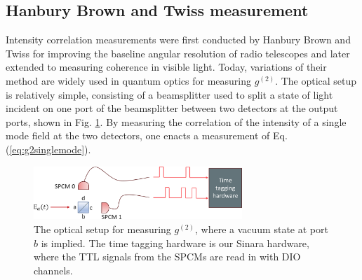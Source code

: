 \subsection{Hanbury Brown and Twiss measurement}

Intensity correlation measurements were first conducted by Hanbury Brown and Twiss for improving the baseline angular resolution of radio telescopes\cite{HANBURYBROWN1956} and later extended to measuring coherence in visible light\cite{brown1958interferometry}. Today, variations of their method are widely used in quantum optics for measuring $g^{(2)}$. The optical setup is relatively simple, consisting of a beamsplitter used to split a state of light incident on one port of the beamsplitter between two detectors at the output ports, shown in Fig. \ref{fig:hbtsetup}. By measuring the correlation of the intensity of a single mode field at the two detectors, one enacts a measurement of Eq. (\ref{eq:g2singlemode}).

\begin{figure}[!h]
    \centering
    \includegraphics[width=0.7\textwidth]{Images/hbt_measurment.pdf}
    \caption{The optical setup for measuring $g^{(2)}$, where a vacuum state at port $b$ is implied. The time tagging hardware is our Sinara hardware, where the TTL signals from the SPCMs are read in with DIO channels.}
    \label{fig:hbtsetup}
\end{figure}

